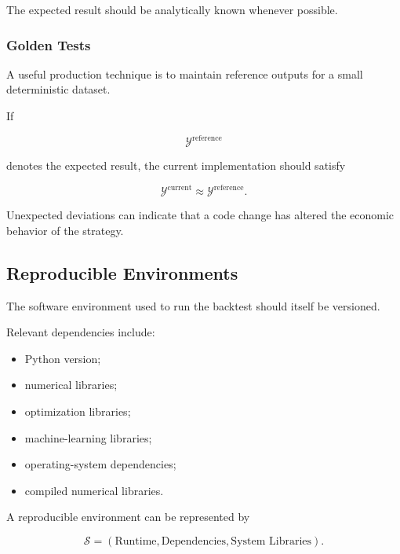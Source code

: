 \documentclass[11pt,a4paper]{article}
\begin{document}
The expected result should be analytically known whenever possible.


\subsubsection{Golden Tests}

A useful production technique is to maintain reference outputs for a small
deterministic dataset.

If

\begin{equation}
\mathcal{Y}^{\mathrm{reference}}
\end{equation}

denotes the expected result, the current implementation should satisfy

\begin{equation}
\boxed{
\mathcal{Y}^{\mathrm{current}}
\approx
\mathcal{Y}^{\mathrm{reference}}.
}
\end{equation}

Unexpected deviations can indicate that a code change has altered the economic
behavior of the strategy.


\subsection{Reproducible Environments}
\label{subsec:reproducible_environments}

The software environment used to run the backtest should itself be versioned.

Relevant dependencies include:

\begin{itemize}
    \item Python version;
    \item numerical libraries;
    \item optimization libraries;
    \item machine-learning libraries;
    \item operating-system dependencies;
    \item compiled numerical libraries.
\end{itemize}

A reproducible environment can be represented by

\begin{equation}
\boxed{
\mathcal{S}
=
\left(
\text{Runtime},
\text{Dependencies},
\text{System Libraries}
\right).
}
\end{equation}
\end{document}

